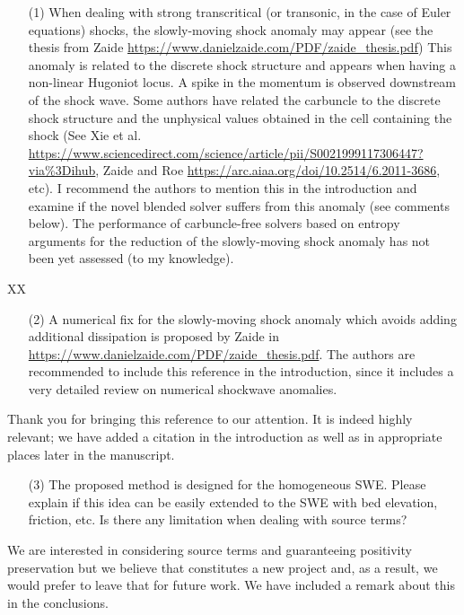 \documentclass[english,11pt]{article}
\begin{document}
\bigskip
{\color{OliveGreen}
  \begin{itemize}
  \item[(1)]
    When dealing with strong transcritical (or transonic, in the case of Euler equations) shocks, 
    the slowly-moving shock anomaly may appear 
    (see the thesis from Zaide \url{https://www.danielzaide.com/PDF/zaide_thesis.pdf})
    This anomaly is related to the discrete shock structure and appears when having a non-linear Hugoniot locus. 
    A spike in the momentum is observed downstream of the shock wave. Some authors have related the carbuncle to 
    the discrete shock structure and the unphysical values obtained in the cell containing the shock 
    (See Xie et al. \url{https://www.sciencedirect.com/science/article/pii/S0021999117306447?via\%3Dihub},
    Zaide and Roe \url{https://arc.aiaa.org/doi/10.2514/6.2011-3686}, etc). I recommend the authors to mention 
    this in the introduction and examine if the novel blended solver suffers from this anomaly (see comments below). 
    The performance of carbuncle-free solvers based on entropy arguments for the reduction of the slowly-moving 
    shock anomaly has not been yet assessed (to my knowledge).
  \end{itemize}
}
\noindent
XX

\bigskip
{\color{OliveGreen}
  \begin{itemize}
  \item[(2)]
    A numerical fix for the slowly-moving shock anomaly which avoids adding additional dissipation is proposed 
    by Zaide in \url{https://www.danielzaide.com/PDF/zaide_thesis.pdf}.
    The authors are recommended to include this reference in the introduction, 
    since it includes a very detailed review on numerical shockwave anomalies.
  \end{itemize}
}
\noindent
Thank you for bringing this reference to our attention.  It is indeed highly relevant; we have
added a citation in the introduction as well as in appropriate places later in the manuscript.

\bigskip
{\color{OliveGreen}
  \begin{itemize}
  \item[(3)]
    The proposed method is designed for the homogeneous SWE. 
    Please explain if this idea can be easily extended to the SWE with bed elevation, friction, etc. 
    Is there any limitation when dealing with source terms?
  \end{itemize}
}
\noindent
We are interested in considering source terms and guaranteeing positivity preservation but 
we believe that constitutes a new project and, as a result, we would prefer to leave that 
for future work. We have included a remark about this in the conclusions. 
      
\end{document}
